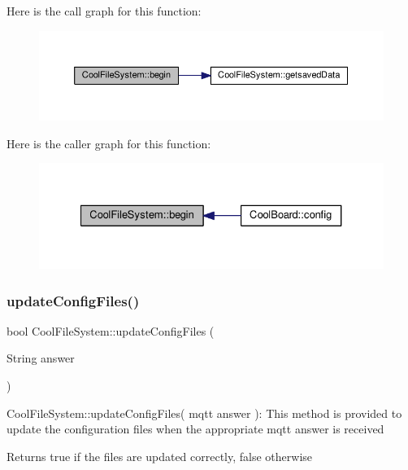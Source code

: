 Here is the call graph for this function\+:\nopagebreak
\begin{figure}[H]
\begin{center}
\leavevmode
\includegraphics[width=350pt]{db/d0c/class_cool_file_system_a6ba6f666ed4c530174f8569d2c636748_cgraph}
\end{center}
\end{figure}
Here is the caller graph for this function\+:\nopagebreak
\begin{figure}[H]
\begin{center}
\leavevmode
\includegraphics[width=327pt]{db/d0c/class_cool_file_system_a6ba6f666ed4c530174f8569d2c636748_icgraph}
\end{center}
\end{figure}
\mbox{\label{class_cool_file_system_adfa8e2e80641ae6f0cceabd348a9b841}} 
\subsubsection{\texorpdfstring{update\+Config\+Files()}{updateConfigFiles()}}
{\footnotesize\ttfamily bool Cool\+File\+System\+::update\+Config\+Files (\begin{DoxyParamCaption}\item[{String}]{answer }\end{DoxyParamCaption})}

Cool\+File\+System\+::update\+Config\+Files( mqtt answer )\+: This method is provided to update the configuration files when the appropriate mqtt answer is received

\begin{DoxyReturn}{Returns}
true if the files are updated correctly, false otherwise 
\end{DoxyReturn}


